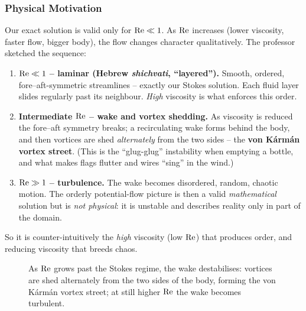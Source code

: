 \documentclass[../main.tex]{subfiles}
\begin{document}
\subsubsection*{Physical Motivation}
Our exact solution is valid only for $\mathrm{Re}\ll1$. As $\mathrm{Re}$ increases (lower viscosity, faster flow, bigger body), the flow changes character qualitatively. The professor sketched the sequence:
\begin{enumerate}
  \item \textbf{$\mathrm{Re}\ll1$ -- laminar (Hebrew \emph{shichvati}, ``layered'').} Smooth, ordered, fore--aft-symmetric streamlines -- exactly our Stokes solution. Each fluid layer slides regularly past its neighbour. \emph{High} viscosity is what enforces this order.
  \item \textbf{Intermediate $\mathrm{Re}$ -- wake and vortex shedding.} As viscosity is reduced the fore--aft symmetry breaks; a recirculating wake forms behind the body, and then vortices are shed \emph{alternately} from the two sides -- the \textbf{von Kármán vortex street}. (This is the ``glug-glug'' instability when emptying a bottle, and what makes flags flutter and wires ``sing'' in the wind.)
  \item \textbf{$\mathrm{Re}\gg1$ -- turbulence.} The wake becomes disordered, random, chaotic motion. The orderly potential-flow picture is then a valid \emph{mathematical} solution but is \emph{not physical}: it is unstable and describes reality only in part of the domain.
\end{enumerate}
So it is counter-intuitively the \emph{high} viscosity (low $\mathrm{Re}$) that produces order, and reducing viscosity that breeds chaos.

\begin{figure}[h]
\centering
{}
\caption{As $\mathrm{Re}$ grows past the Stokes regime, the wake destabilises: vortices are shed alternately from the two sides of the body, forming the von Kármán vortex street; at still higher $\mathrm{Re}$ the wake becomes turbulent.}
\label{fig:lec21_vortex}
\end{figure}
\end{document}
